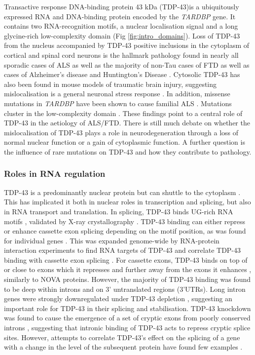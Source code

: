 Transactive response DNA-binding protein 43 kDa (TDP-43)is a ubiquitously expressed RNA and DNA-binding protein encoded by the \emph{TARDBP} gene. 
It contains two RNA-recognition motifs, a nuclear localisation signal and a long glycine-rich low-complexity domain (Fig \ref{fig:intro_domains}).
Loss of TDP-43 from the nucleus accompanied by TDP-43 positive inclusions in the cytoplasm of cortical and spinal cord neurons is the hallmark pathology found in nearly all sporadic cases of ALS as well as the majority of non-Tau cases of FTD \citep{Neumann2006,Arai2006} as well as cases of Alzheimer's disease \citep{LaClair2016} and Huntington's Disease \citep{Doi2008}. 
Cytosolic TDP-43 has also been found in mouse models of traumatic brain injury, suggesting mislocalisation is a general neuronal stress response \citep{Moisse2009}. 
In addition, missense mutations in \emph{TARDBP} have been shown to cause familial ALS \citep{Sreedharan2008-xv}.  Mutations cluster in the low-complexity domain \citep{Kapeli2017}.
These findings point to a central role of TDP-43 in the aetiology of ALS/FTD. 
There is still much debate on whether the mislocalisation of TDP-43 plays a role in neurodegeneration through a loss of normal nuclear function or a gain of cytoplasmic function.  
A further question is the influence of rare mutations on TDP-43 and how they contribute to pathology.

\subsubsection{Roles in RNA regulation}

TDP-43 is a predominantly nuclear protein but can shuttle to the cytoplasm \citep{Ayala2008}. 
This has implicated it both in nuclear roles in transcription and splicing, but also in RNA transport and translation. 
In splicing, TDP-43 binds UG-rich RNA motifs \citep{Buratti2001a, Buratti2001}, validated by X-ray crystallography \citep{Lukavsky2013}. 
TDP-43 binding can either repress or enhance cassette exon splicing depending on the motif position, as was found for individual genes \citep{Mercado2005-js,Bose2008-du,Shiga2012-it}.
This was expanded genome-wide by RNA-protein interaction experiments to find RNA targets of TDP-43 and correlate TDP-43 binding with cassette exon splicing \citep{Polymenidou2011,Tollervey2011,Kapeli2016}. %
For cassette exons, TDP-43 binds on top of or close to exons which it represses and further away from the exons it enhances \citep{Tollervey2011}, similarly to NOVA proteins.
However, the majority of TDP-43 binding was found to be deep within introns and on 3' untranslated regions (3'UTRs).
Long intron genes were strongly downregulated under TDP-43 depletion \citep{Polymenidou2011}, suggesting an important role for TDP-43 in their splicing and stabilisation. 
TDP-43 knockdown was found to cause the emergence of a set of cryptic exons from poorly conserved introns \citep{Ling2015}, suggesting that intronic binding of TDP-43 acts to repress cryptic splice sites.
However, attempts to correlate TDP-43's effect on the splicing of a gene with a change in the level of the subsequent protein have found few examples \citep{DeConti2015,Stalekar2015}.

